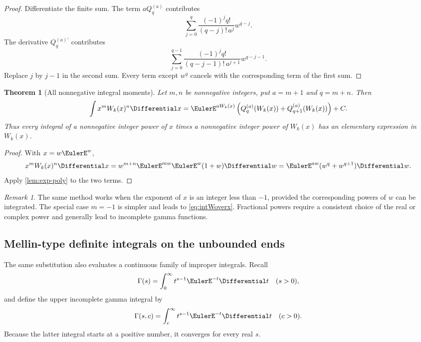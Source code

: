 \documentclass[11pt]{article}
\newtheorem{theorem}{Theorem}[section]
\theoremstyle{remark}
\newtheorem{remark}[remark]{Remark}
\begin{document}
\begin{proof}
Differentiate the finite sum.  The term \(aQ_q^{(a)}\) contributes
\[
 \sum_{j=0}^q
 \frac{(-1)^j q!}{(q-j)!\,a^j}w^{q-j}.
\]
The derivative \(Q_q^{(a)\prime}\) contributes
\[
 \sum_{j=0}^{q-1}
 \frac{(-1)^j q!}{(q-j-1)!\,a^{j+1}}w^{q-j-1}.
\]
Replace \(j\) by \(j-1\) in the second sum.  Every term except \(w^q\)
cancels with the corresponding term of the first sum.
\end{proof}

\begin{theorem}[All nonnegative integral moments]\label{thm:moments}
Let \(m,n\) be nonnegative integers, put \(a=m+1\) and \(q=m+n\).
Then
\begin{equation}\label{eq:momentformula}
 \int x^m W_k(x)^n\Differential x
 =\EulerE^{aW_k(x)}
 \left(
  Q_q^{(a)}(W_k(x))
  +Q_{q+1}^{(a)}(W_k(x))
 \right)+C.
\end{equation}
Thus every integral of a nonnegative integer power of \(x\) times a
nonnegative integer power of \(W_k(x)\) has an elementary expression in
\(W_k(x)\).
\end{theorem}

\begin{proof}
With \(x=w\EulerE^w\),
\[
 x^mW_k(x)^n\Differential x
 =w^{m+n}\EulerE^{mw}\EulerE^w(1+w)\Differential w
 =\EulerE^{aw}(w^q+w^{q+1})\Differential w.
\]
Apply \cref{lem:exp-poly} to the two terms.
\end{proof}

\begin{remark}
The same method works when the exponent of \(x\) is an integer less than
\(-1\), provided the corresponding powers of \(w\) can be integrated.
The special case \(m=-1\) is simpler and leads to
\eqref{eq:intWoverx}.  Fractional powers require a consistent choice of
the real or complex power and generally lead to incomplete gamma functions.
\end{remark}


\subsection{Mellin-type definite integrals on the unbounded ends}

The same substitution also evaluates a continuous family of improper
integrals.  Recall
\[
 \Gamma(s)=\int_0^\infty t^{s-1}\EulerE^{-t}\Differential t
 \quad(s>0),
\]
and define the upper incomplete gamma integral by
\[
 \Gamma(s,c)=\int_c^\infty t^{s-1}\EulerE^{-t}\Differential t
 \quad(c>0).
\]
Because the latter integral starts at a positive number, it converges for
every real \(s\).
\end{document}
